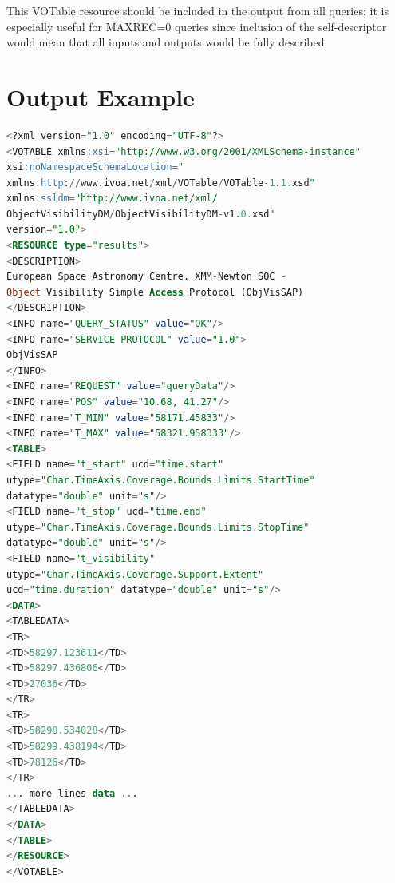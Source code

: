 \documentclass[11pt,a4paper]{ivoa}
\begin{document}
This VOTable resource should be included in the output from all queries;
it is especially useful for MAXREC=0 queries since inclusion of the
self-descriptor would mean that all inputs and outputs would be fully
described

\section{Output Example}
\begin{lstlisting}[language=SQL]
<?xml version="1.0" encoding="UTF-8"?>
<VOTABLE xmlns:xsi="http://www.w3.org/2001/XMLSchema-instance"
xsi:noNamespaceSchemaLocation="
xmlns:http://www.ivoa.net/xml/VOTable/VOTable-1.1.xsd"
xmlns:ssldm="http://www.ivoa.net/xml/
ObjectVisibilityDM/ObjectVisibilityDM-v1.0.xsd"
version="1.0">
<RESOURCE type="results">
<DESCRIPTION>
European Space Astronomy Centre. XMM-Newton SOC -
Object Visibility Simple Access Protocol (ObjVisSAP)
</DESCRIPTION>
<INFO name="QUERY_STATUS" value="OK"/>
<INFO name="SERVICE PROTOCOL" value="1.0">
ObjVisSAP
</INFO>
<INFO name="REQUEST" value="queryData"/>
<INFO name="POS" value="10.68, 41.27"/>
<INFO name="T_MIN" value="58171.45833"/>
<INFO name="T_MAX" value="58321.958333"/>
<TABLE>
<FIELD name="t_start" ucd="time.start"
utype="Char.TimeAxis.Coverage.Bounds.Limits.StartTime"
datatype="double" unit="s"/>
<FIELD name="t_stop" ucd="time.end"
utype="Char.TimeAxis.Coverage.Bounds.Limits.StopTime"
datatype="double" unit="s"/>
<FIELD name="t_visibility"
utype="Char.TimeAxis.Coverage.Support.Extent"
ucd="time.duration" datatype="double" unit="s"/>
<DATA>
<TABLEDATA>
<TR>
<TD>58297.123611</TD>
<TD>58297.436806</TD>
<TD>27036</TD>
</TR>
<TR>
<TD>58298.534028</TD>
<TD>58299.438194</TD>
<TD>78126</TD>
</TR>
... more lines data ...
</TABLEDATA>
</DATA>
</TABLE>
</RESOURCE>
</VOTABLE>
\end{lstlisting}

\appendix
\renewcommand{\thesection}{\Alph{section}.\arabic{section}}
\setcounter{section}{0}
\end{document}
